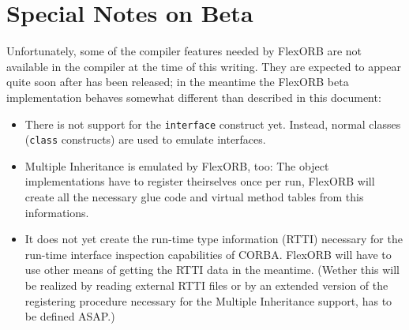 \documentclass{report}
\begin{document}
\chapter{Special Notes on \fpc Beta}
\label{ChapterFPCBeta}
Unfortunately, some of the compiler features needed by FlexORB are not available
in the compiler at the time of this writing. They are expected to appear quite
soon after  has been released; in the meantime the FlexORB beta
implementation behaves somewhat different than described in this document:
\begin{itemize}
\item There is not support for the \texttt{interface} construct yet. Instead,
      normal classes (\texttt{class} constructs) are used to emulate interfaces.
\item Multiple Inheritance is emulated by FlexORB, too: The object
      implementations have to register theirselves once per run, FlexORB will
      create all the necessary glue code and virtual method tables from this
      informations.
\item It does not yet create the run-time type information (RTTI) necessary for
      the run-time interface inspection capabilities of CORBA. FlexORB will have
      to use other means of getting the RTTI data in the meantime.
      (Wether this
      will be realized by reading external RTTI files or by an extended version
      of the registering procedure necessary for the Multiple Inheritance
      support, has to be defined ASAP.)
\end{itemize}
\end{document}
